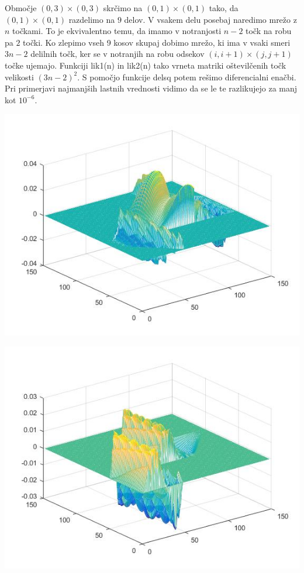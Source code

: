 \documentclass[11pt]{article} %
\begin{document}
Območje $(0,3)\times(0,3)$ skrčimo na $(0,1)\times(0,1)$ tako, da $(0,1)\times(0,1)$ razdelimo na $9$ delov. V vsakem delu posebaj naredimo mrežo z $n$ točkami. To je ekvivalentno temu, da imamo v notranjosti $n-2$ točk na robu pa $2$ točki. Ko zlepimo vseh 9 kosov skupaj dobimo mrežo, ki ima v vsaki smeri $3n-2$ delilnih točk, ker se v notranjih na robu odsekov $(i,i+1)\times(j,j+1)$ točke ujemajo. Funkciji lik1(n) in lik2(n) tako vrneta matriki oštevilčenih točk velikosti $(3n-2)^2$. S pomočjo funkcije delsq potem rešimo diferencialni enačbi. Pri primerjavi najmanjših lastnih vrednosti vidimo da se le te razlikujejo za manj kot $10^{-6}$.
\newpage
\begin{centering}
\includegraphics[scale=0.4]{lastna1}
\end{centering}

\begin{centering}
\includegraphics[scale=0.4]{lastna2}
\end{centering}
\end{document}
